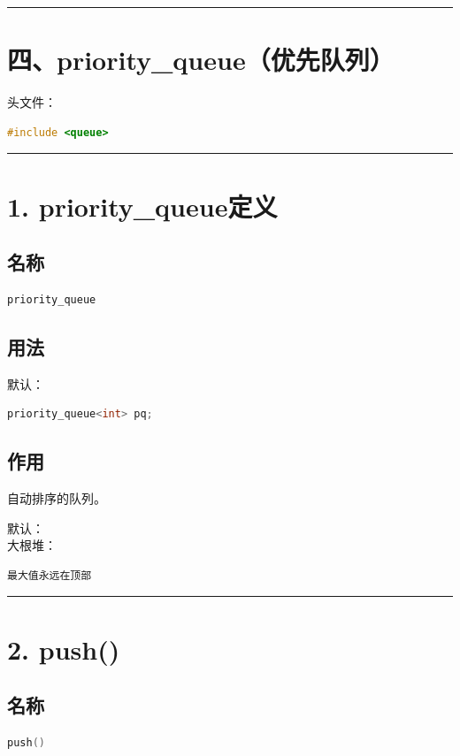 \documentclass[9pt,twocolumn]{extarticle}
\begin{document}
\noindent\rule{\linewidth}{0.4pt}

\section{四、priority\_queue（优先队列）}

头文件：
\begin{lstlisting}[language=C++]
#include <queue>
\end{lstlisting}

\noindent\rule{\linewidth}{0.4pt}

\section{1. priority\_queue定义}

\subsection{名称}
\begin{lstlisting}[language=C++]
priority_queue
\end{lstlisting}

\subsection{用法}
默认：
\begin{lstlisting}[language=C++]
priority_queue<int> pq;
\end{lstlisting}

\subsection{作用}
自动排序的队列。

默认：\\
大根堆：
\begin{lstlisting}
最大值永远在顶部
\end{lstlisting}

\noindent\rule{\linewidth}{0.4pt}

\section{2. push()}

\subsection{名称}
\begin{lstlisting}[language=C++]
push()
\end{lstlisting}
\end{document}
